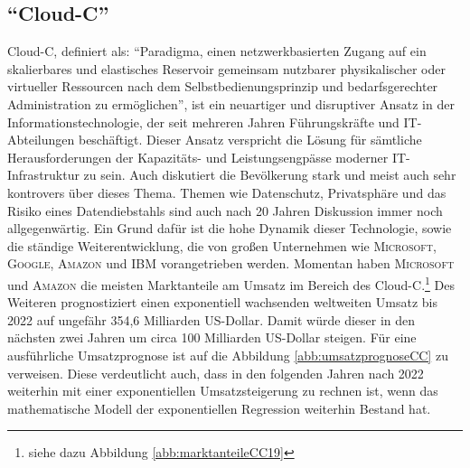 \subsection{\enquote{\ac{Cloud-C}}}
\ac{Cloud-C}, definiert als: \enquote{Paradigma, einen netzwerkbasierten Zugang auf ein skalierbares und  elastisches Reservoir gemeinsam nutzbarer physikalischer oder virtueller Ressourcen nach dem Selbstbedienungsprinzip und bedarfsgerechter Administration zu ermöglichen}\autocite[][S.\,7]{dindeutsches_institut_fur_normung_informationstechnik_2020-2}, ist ein neuartiger und disruptiver Ansatz in der Informationstechnologie, der seit mehreren Jahren Führungskräfte und IT-Abteilungen beschäftigt. Dieser Ansatz verspricht die Lösung für sämtliche Herausforderungen der Kapazitäts- und Leistungsengpässe moderner IT-Infrastruktur zu sein.\autocite[vgl.][S.\,4]{reinheimer_cloud_2018} Auch diskutiert die Bevölkerung stark und meist auch sehr kontrovers über dieses Thema. Themen wie Datenschutz,  Privatsphäre und das Risiko eines Datendiebstahls sind auch nach 20 Jahren Diskussion immer noch allgegenwärtig. Ein Grund dafür ist die hohe Dynamik dieser Technologie, sowie die ständige Weiterentwicklung, die von großen Unternehmen wie \textsc{Microsoft}, \textsc{Google}, \textsc{Amazon} und \textsc{IBM} vorangetrieben werden. Momentan haben \textsc{Microsoft} und \textsc{Amazon} die meisten Marktanteile am Umsatz im Bereich des \ac{Cloud-C}.\footnote{siehe dazu Abbildung \vref{abb:marktanteileCC19}} Des Weiteren prognostiziert \cite{gartner_cloud_2019} einen exponentiell wachsenden weltweiten Umsatz bis 2022 auf ungefähr 354,6 Milliarden US-Dollar. Damit würde dieser in den nächsten zwei Jahren um circa 100 Milliarden US-Dollar steigen. Für eine ausführliche Umsatzprognose ist auf die Abbildung \vref{abb:umsatzprognoseCC} zu verweisen. Diese verdeutlicht auch, dass in den folgenden Jahren nach 2022 weiterhin mit einer exponentiellen Umsatzsteigerung zu rechnen ist, wenn das mathematische Modell der exponentiellen Regression weiterhin Bestand hat. 
\par

